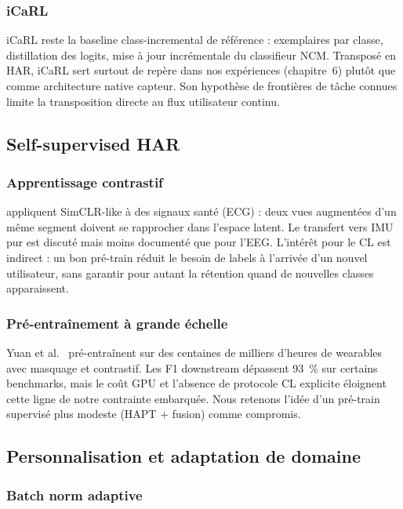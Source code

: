 \documentclass[a4paper,12pt]{report}
\begin{document}
\subsubsection{iCaRL \parencite{rebuffi2017}}

iCaRL reste la baseline class-incremental de référence : exemplaires par classe,
distillation des logits, mise à jour incrémentale du classifieur NCM. Transposé
en HAR, iCaRL sert surtout de repère dans nos expériences (chapitre~6) plutôt
que comme architecture native capteur. Son hypothèse de frontières de tâche
connues limite la transposition directe au flux utilisateur continu.

\subsection{Self-supervised HAR}

\subsubsection{Apprentissage contrastif}

\textcite{tang2021} appliquent SimCLR-like à des signaux santé (ECG) : deux vues
augmentées d'un même segment doivent se rapprocher dans l'espace latent. Le
transfert vers IMU pur est discuté mais moins documenté que pour l'EEG. L'intérêt
pour le CL est indirect : un bon pré-train réduit le besoin de labels à l'arrivée
d'un nouvel utilisateur, sans garantir pour autant la rétention quand de nouvelles
classes apparaissent.

\subsubsection{Pré-entraînement à grande échelle}

Yuan et al.\ \parencite{yuan2024} pré-entraînent sur des centaines de milliers
d'heures de wearables avec masquage et contrastif. Les F1 downstream dépassent
93~\% sur certains benchmarks, mais le coût GPU et l'absence de protocole CL
explicite éloignent cette ligne de notre contrainte embarquée. Nous retenons
l'idée d'un pré-train supervisé plus modeste (HAPT + fusion) comme compromis.

\subsection{Personnalisation et adaptation de domaine}

\subsubsection{Batch norm adaptive}
\end{document}
